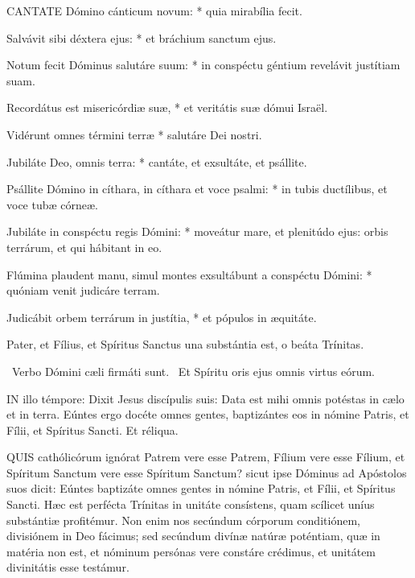\lettrine[lines=2]{C}{ANTATE} Dómino cánticum novum: * quia mirabília fecit.

Salvávit sibi déxtera ejus: * et bráchium sanctum ejus.

Notum fecit Dóminus salutáre suum: * in conspéctu géntium revelávit justítiam suam.

Recordátus est misericórdiæ suæ, * et veritátis suæ dómui Israël.

Vidérunt omnes términi terræ * salutáre Dei nostri.

Jubiláte Deo, omnis terra: * cantáte, et exsultáte, et psállite.

Psállite Dómino in cíthara, in cíthara et voce psalmi: * in tubis ductílibus, et voce tubæ córneæ.

Jubiláte in conspéctu regis Dómini: * moveátur mare, et plenitúdo ejus: orbis terrárum, et qui hábitant in eo.

Flúmina plaudent manu, simul montes exsultábunt a conspéctu Dómini: * quóniam venit judicáre terram.

Judicábit orbem terrárum in justítia, * et pópulos in æquitáte.

 Pater, et Fílius, et Spíritus Sanctus una substántia est, o beáta Trínitas.

\V\ Verbo Dómini cæli firmáti sunt. \R\ Et Spíritu oris ejus omnis virtus eórum.



\lettrine[lines=2]{I}{N} illo témpore: Dixit Jesus discípulis suis: Data est mihi omnis potéstas in cælo et in terra. Eúntes ergo docéte omnes gentes, baptizántes eos in nómine Patris, et Fílii, et Spíritus Sancti. Et réliqua.



\lettrine[lines=2]{Q}{UIS} cathólicórum ignórat Patrem vere esse Patrem, Fílium vere esse Fílium, et Spíritum Sanctum vere esse Spíritum Sanctum? sicut ipse Dóminus ad Apóstolos suos dicit: Eúntes baptizáte omnes gentes in nómine Patris, et Fílii, et Spíritus Sancti. Hæc est perfécta Trínitas in unitáte consístens, quam scílicet uníus substántiæ profitémur. Non enim nos secúndum córporum conditiónem, divisiónem in Deo fácimus; sed secúndum divínæ natúræ poténtiam, quæ in matéria non est, et nóminum persónas vere constáre crédimus, et unitátem divinitátis esse testámur.


